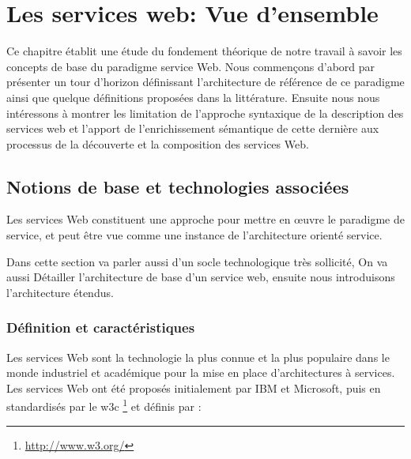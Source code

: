
\chapter{Les services web: Vue d'ensemble}
Ce chapitre établit une étude du fondement théorique de notre travail
à savoir les concepts de base du paradigme service Web.  Nous
commençons d'abord par présenter un tour d'horizon définissant
l'architecture de référence de ce paradigme ainsi que quelque
définitions proposées dans la littérature. Ensuite nous nous
intéressons à montrer les limitation de l'approche syntaxique de la
description des services web et l'apport de l'enrichissement
sémantique de cette dernière aux processus de la découverte et la
composition des services Web.\\



\newpage
\section{Notions de base et technologies associées}
\label{sec:ws-notions-de-base}
Les services Web constituent une approche pour mettre en œuvre le
paradigme de service, et peut être vue comme une instance de
l'architecture orienté service.

Dans cette section va parler aussi d'un socle technologique très
sollicité, On va aussi Détailler l'architecture de base d'un service
web, ensuite nous introduisons l'architecture étendus.

  \subsection{Définition et caractéristiques }
  Les services Web sont la technologie la plus connue et la plus
  populaire dans le monde industriel et académique pour la mise en
  place d'architectures à services.
  Les services Web ont été proposés initialement par IBM
  \cite{kreger2001web} et Microsoft, puis en standardisés par le
  \acrshort{w3c} \footnote{\url{http://www.w3.org/}} et définis
  \cite{WSA} par :\\

